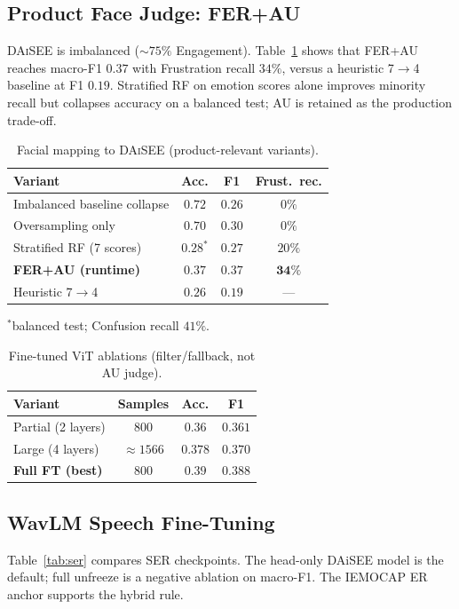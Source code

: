 \documentclass[conference]{IEEEtran}
\begin{document}
\subsection{Product Face Judge: FER+AU}
\textsc{DAiSEE} is imbalanced ($\sim\!75\%$ Engagement). Table~\ref{tab:ferau}
shows that FER+AU reaches macro-F1 $0.37$ with Frustration recall $34\%$,
versus a heuristic 7$\rightarrow$4 baseline at F1 $0.19$. Stratified RF on
emotion scores alone improves minority recall but collapses accuracy on a
balanced test; AU is retained as the production trade-off.

\begin{table}[!t]
\caption{Facial mapping to \textsc{DAiSEE} (product-relevant variants).}
\label{tab:ferau}
\centering
\begin{tabular}{@{}lccc@{}}
\toprule
\textbf{Variant} & \textbf{Acc.} & \textbf{F1} & \textbf{Frust.\ rec.} \\
\midrule
Imbalanced baseline collapse & $0.72$ & $0.26$ & $0\%$ \\
Oversampling only & $0.70$ & $0.30$ & $0\%$ \\
Stratified RF (7 scores) & $0.28^{*}$ & $0.27$ & $20\%$ \\
\textbf{FER+AU (runtime)} & $0.37$ & $\mathbf{0.37}$ & $\mathbf{34\%}$ \\
Heuristic 7$\rightarrow$4 & $0.26$ & $0.19$ & --- \\
\bottomrule
\end{tabular}
\vspace{2pt}
{\raggedright\footnotesize $^{*}$balanced test; Confusion recall $41\%$.\par}
\end{table}

\begin{table}[!t]
\caption{Fine-tuned ViT ablations (filter/fallback, not AU judge).}
\label{tab:vit}
\centering
\begin{tabular}{@{}lccc@{}}
\toprule
\textbf{Variant} & \textbf{Samples} & \textbf{Acc.} & \textbf{F1} \\
\midrule
Partial (2 layers) & $800$ & $0.36$ & $0.361$ \\
Large (4 layers) & ${\approx}1566$ & $0.378$ & $0.370$ \\
\textbf{Full FT (best)} & $800$ & $\mathbf{0.39}$ & $\mathbf{0.388}$ \\
\bottomrule
\end{tabular}
\end{table}

\subsection{WavLM Speech Fine-Tuning}
Table~\ref{tab:ser} compares SER checkpoints. The head-only DAiSEE model is the
default; full unfreeze is a negative ablation on macro-F1. The IEMOCAP ER
anchor supports the hybrid rule.
\end{document}
